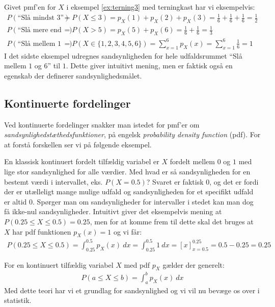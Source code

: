 \begin{example}
Givet pmf'en for $X$ i eksempel \ref{ex:terning3} med terningkast har vi eksempelvis:
\begin{align*}
P(\text{``Slå mindst 3''}) &= P(X \leq 3) = p_X(1) + p_X(2) + p_X(3) = \frac{1}{6} + \frac{1}{6} + \frac{1}{6} = \frac{1}{2} \\
P(\text{``Slå mere end 4''}) &= P(X > 5) = p_X(5) + p_X(6) = \frac{1}{6} + \frac{1}{6} = \frac{1}{3} \\ 
P(\text{``Slå mellem 1 og 6''}) &= P(X \in \{1,2,3,4,5,6\}) = \sum_{x = 1}^6 p_X(x) =  \sum_{x = 1}^6 \frac{1}{6} = 1
\end{align*}
I det sidste eksempel udregnes sandsynligheden for hele udfaldsrummet ``Slå mellem $1$ og $6$'' til $1$. Dette giver intuitivt mening, men er faktisk også en egenskab der definerer sandsynlighedsmålet. 
\end{example}
%
\subsection{Kontinuerte fordelinger}
Ved kontinuerte fordelinger snakker man istedet for pmf'er om \textit{sandsynlighedstæthedsfunktioner}, på engelsk \textit{probability density function} (pdf). For at forstå forskellen ser vi på følgende eksempel.
\begin{example} \label{ex:unif1}
En klassisk kontinuert fordelt tilfældig variabel er $X$ fordelt mellem $0$ og $1$ med lige stor sandsynlighed for alle værdier. Med hvad er så sandsynligheden for en bestemt værdi i intervallet, eks. $P(X = 0.5)$? Svaret er faktisk $0$, og det er fordi der er utælleligt mange mulige udfald og sandsynligheden for et specifikt udfald er altid $0$. Spørger man om sandsynligheder for intervaller i stedet kan man dog få ikke-nul sandsynligheder. Intuitivt giver det eksempelvis mening at $P(0.25 \leq X \leq 0.5) = 0.25$, men for at komme frem til dette skal det bruges at $X$ har pdf funktionen $p_X(x) = 1$ og vi får:
\begin{align*}
P(0.25 \leq X \leq 0.5) = \int_{0.25}^{0.5} p_X(x) \ dx = \int_{0.25}^{0.5} 1 \ dx = \left[x \right]_{x = 0.5}^{0.25} = 0.5 - 0.25 = 0.25
\end{align*}
\end{example} 
For en kontinuert tilfældig variabel $X$ med pdf $p_X$ gælder der generelt:
\begin{align*}
P(a \leq X \leq b) = \int_a^b p_X(x) \ dx
\end{align*}
Med dette teori har vi et grundlag for sandsynlighed og vi vil nu bevæge os over i statistik. 